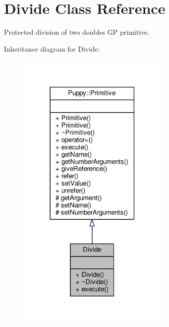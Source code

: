 \hypertarget{classDivide}{}\section{Divide Class Reference}
\label{classDivide}


Protected division of two doubles G\+P primitive.  




Inheritance diagram for Divide\+:
\nopagebreak
\begin{figure}[H]
\begin{center}
\leavevmode
\includegraphics[width=207pt]{classDivide__inherit__graph}
\end{center}
\end{figure}



